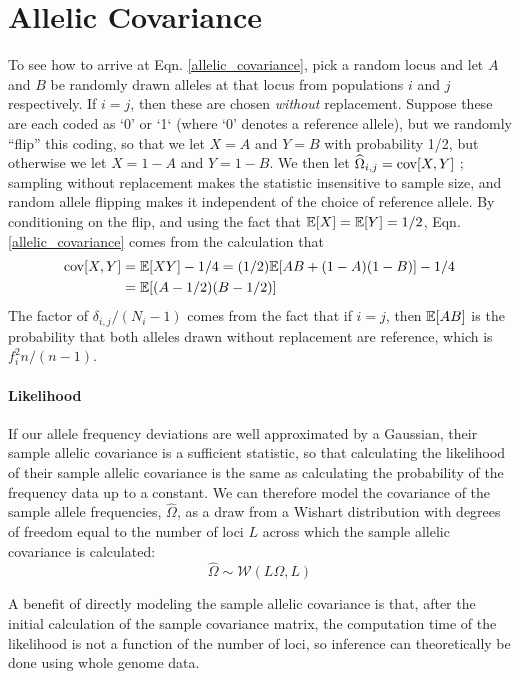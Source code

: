 \documentclass[12pt]{article}
\begin{document}
\section{Allelic Covariance}\label{allelic_cov}
To see how to arrive at Eqn. \eqref{allelic_covariance},
pick a random locus and
let $A$ and $B$ be randomly drawn alleles at that locus from populations $i$ and $j$ respectively.
If $i=j$, then these are chosen \emph{without} replacement.
Suppose these are each coded as `0' or `1` (where `0' denotes a reference allele),
but we randomly ``flip'' this coding, so that we let $X=A$ and $Y=B$ with probability 1/2,
but otherwise we let $X=1-A$ and $Y=1-B$.
We then let $\widehat{\Omega}_{i,j} = \mathop{\mbox{cov}}[X,Y]$ ; 
sampling without replacement makes the statistic insensitive to sample size,
and random allele flipping makes it independent of the choice of reference allele.
By conditioning on the flip,
and using the fact that $\mathbb{E}[X] = \mathbb{E}[Y] = 1/2$,
Eqn. \eqref{allelic_covariance} comes from the calculation that
\begin{align}
\mathop{\mbox{cov}}[X,Y] &= \mathbb{E}[XY] - 1/4 = (1/2)\mathbb{E}[AB + (1-A)(1-B)] - 1/4\\\notag
&= \mathbb{E}[(A-1/2)(B-1/2)]
\end{align}
The factor of $\delta_{i,j}/(N_i-1)$ comes from the fact that if $i=j$,
then $\mathbb{E}[AB]$ is the probability that both alleles drawn without replacement are reference,
which is $f_i^2 n/(n-1)$.
\paragraph{Likelihood}
If our allele frequency deviations are well approximated by a Gaussian, 
their sample allelic covariance is a sufficient statistic,
so that calculating the likelihood of their sample allelic covariance is the same as 
calculating the probability of the frequency data up to a constant. 
We can therefore model the covariance of the sample allele frequencies, $\widehat{\Omega}$, 
as a draw from a Wishart distribution with degrees of freedom equal to 
the number of loci $L$ across which the sample allelic covariance is calculated:
\begin{equation}
\widehat{\Omega} \sim \mathcal{W}\left( L\Omega, L	\right)
\label{wishart}
\end{equation}

A benefit of directly modeling the sample allelic covariance is that, 
after the initial calculation of the sample covariance matrix,
the computation time of the likelihood is not a function of the number of loci,
so inference can theoretically be done using whole genome data.
\end{document}
